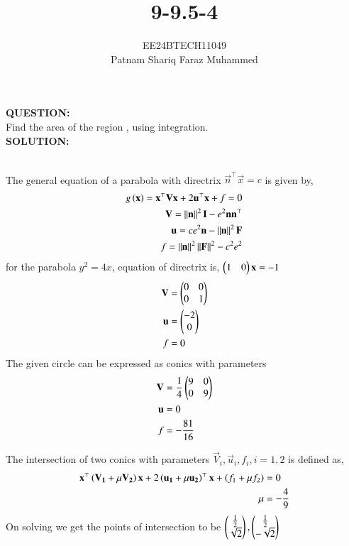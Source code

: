 \documentclass[journal]{IEEEtran}
\numberwithin{equation}{enumi}
\numberwithin{figure}{enumi}
\begin{document}


\title{9-9.5-4}
\author{EE24BTECH11049 \\ Patnam Shariq Faraz Muhammed}

{\let\newpage\relax\maketitle}

\textbf{QUESTION:} \\
	Find the area of the region  , using integration.\\
\textbf{SOLUTION:} \\
	\begin{table}[h!]    
		\centering
		
		\label{table: 9-9.5-4}
	\end{table}\\

	The general equation of a parabola with directrix $\vec{n}^{\top}\vec{x}=c$ is given by,
	\begin{align*}
		g\left(\mathbf{x}\right)=\mathbf{x}^{\top}\mathbf{V}\mathbf{x}+2\mathbf{u}^{\top}\mathbf{x}+f=0\\
		\mathbf{V}=\left\lVert\mathbf{n}\right\rVert^2\mathbf{I}-e^2\mathbf{n}\mathbf{n}^{\top}\\
		\mathbf{u}=ce^2\mathbf{n}-\left\lVert\mathbf{n}\right\rVert^2\mathbf{F}\\
		f=\left\lVert\mathbf{n}\right\rVert^2\left\lVert\mathbf{F}\right\rVert^2-c^2e^2
	\end{align*}
	for the parabola $y^2=4x$, equation of directrix is, $\begin{pmatrix}1&0\end{pmatrix}\mathbf{x}=-1$
	\begin{align*}
		\mathbf{V}&=\begin{pmatrix}0&0\\0&1\end{pmatrix}\\
		\mathbf{u}&=\begin{pmatrix}-2\\0\end{pmatrix}\\
		f&=0
	\end{align*}
	The given circle can be expressed as conics with parameters
	\begin{align*}
		\mathbf{V}&=\frac{1}{4}\begin{pmatrix}9 & 0\\0 & 9\end{pmatrix}\\
		\mathbf{u}&=0\\
		f&=-\frac{81}{16}
	\end{align*}

	The intersection of two conics with parameters $\vec{V}_i,\vec{u}_i,f_i, i=1,2$ is defined as,
	\begin{align*}
		\mathbf{x}^{\top}\left(\mathbf{V_1}+\mu\mathbf{V_2}\right)\mathbf{x}+2\left(\mathbf{u_1}+\mu\mathbf{u_2}\right)^{\top}\mathbf{x}+\left(f_1+\mu f_2\right)&=0\\
		\mu&=-\frac{4}{9}\\
	\end{align*} 
	On solving we get the points of intersection to be $\begin{pmatrix}\frac{1}{2}\\\sqrt{2}\end{pmatrix}, \begin{pmatrix}\frac{1}{2}\\-\sqrt{2}\end{pmatrix}$\\
	
\end{document}
